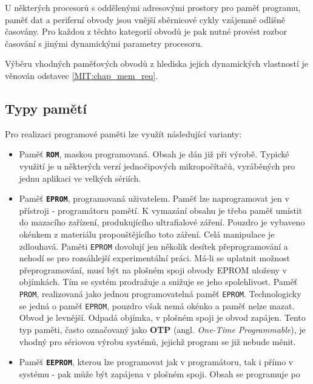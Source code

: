     U některých procesorů s oddělenými adresovými prostory pro paměť programu, paměť dat a 
    periferní obvody jsou vnější sběrnicové cykly vzájemně odlišně časovány. Pro každou z těchto 
    kategorií obvodů je pak nutné provést rozbor časování s jinými dynamickými parametry procesoru.
    
    Výběru vhodných paměťových obvodů z hlediska jejich dynamických vlastností je věnován odstavec 
    \ref{MIT:chap_mem_req}.
    
    \subsection{Typy pamětí}
      Pro realizaci programové paměti lze využít následující varianty:
      \begin{itemize}\addtolength{\itemsep}{-0.5\baselineskip}
        \item Paměť \textbf{\texttt{ROM}}, maskou programovaná. Obsah je dán již při výrobě.        
              Typické využití je u některých verzí jednočipových mikropočítačů, vyráběných pro 
              jednu aplikaci ve velkých sériích.
        \item Paměť \textbf{\texttt{EPROM}}, programovaná uživatelem. Paměť lze naprogramovat jen 
              v přístroji - programátoru pamětí. K vymazání obsahu je třeba paměť umístit do 
              mazacího zařízení, produkujícího ultrafialové záření. Pouzdro je vybaveno okénkem z 
              materiálu propouštějícího toto záření. Celá manipulace je zdlouhavá. Paměti 
              \texttt{EPROM} dovolují jen několik desítek přeprogramování a nehodí se pro 
              rozsáhlejší experimentální práci. Má-li se uplatnit možnost přeprogramování, musí být 
              na plošném spoji obvody EPROM uloženy v objímkách. Tím se systém prodražuje a 
              snižuje se jeho spolehlivost. Paměť \texttt{PROM}, realizovaná jako jednou 
              programovatelná paměť \texttt{EPROM}. Technologicky se jedná o paměť \texttt{EPROM}, 
              pouzdro však nemá okénko a paměť nelze mazat. Obvod je levnější. Odpadá objímka, v 
              plošném spoji je obvod zapájen. Tento typ paměti, často označovaný jako \textbf{OTP} 
              (angl. \emph{One-Time Programmable}), je vhodný pro sériovou výrobu systémů, jejichž 
              program se již nebude měnit.
        \item Paměť \textbf{\texttt{EEPROM}}, kterou lze programovat jak v programátoru, tak i přímo
              v systému - pak může být zapájena v plošném spoji. Obsah se programuje po 

\end{itemize}
